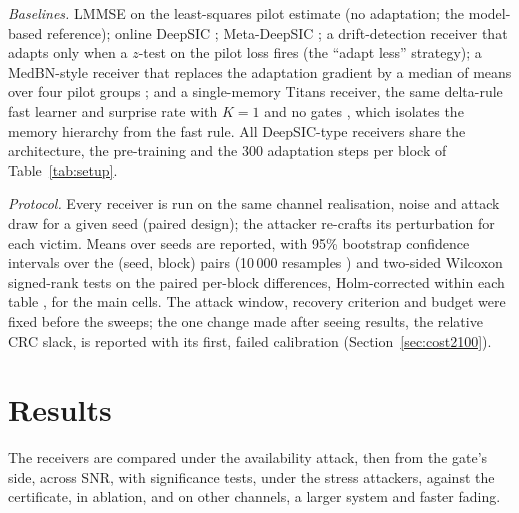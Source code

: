 \documentclass[journal]{IEEEtran}
\begin{document}
\textit{Baselines.} LMMSE on the least-squares pilot estimate (no adaptation; the
model-based reference); online DeepSIC \cite{shlezinger2021}; Meta-DeepSIC
\cite{raviv2023}; a drift-detection receiver that adapts only when a $z$-test on the
pilot loss fires (the ``adapt less'' strategy); a MedBN-style receiver that replaces the
adaptation gradient by a median of means over four pilot groups \cite{medbn}; and a
single-memory Titans receiver, the same delta-rule fast learner and surprise rate with
$K=1$ and no gates \cite{behrouz2025titans}, which isolates the memory hierarchy from the
fast rule. All DeepSIC-type receivers share the architecture, the pre-training and the
300 adaptation steps per block of Table~\ref{tab:setup}.

\textit{Protocol.} Every receiver is run on the same channel realisation, noise and
attack draw for a given seed (paired design); the attacker re-crafts its perturbation
for each victim. Means over seeds are reported, with 95\% bootstrap confidence intervals
over the (seed, block) pairs (10\,000 resamples \cite{efron1993}) and two-sided Wilcoxon
signed-rank tests \cite{wilcoxon1945} on the paired per-block differences,
Holm-corrected within each table \cite{holm1979}, for the main cells. The attack window, recovery criterion and budget were fixed before the sweeps; the one
change made after seeing results, the relative CRC slack, is reported with its first,
failed calibration (Section~\ref{sec:cost2100}).

\section{Results}\label{sec:results}
The receivers are compared under the availability attack, then from the gate's side,
across SNR, with significance tests, under the stress attackers, against the certificate,
in ablation, and on other channels, a larger system and faster fading.
\end{document}
